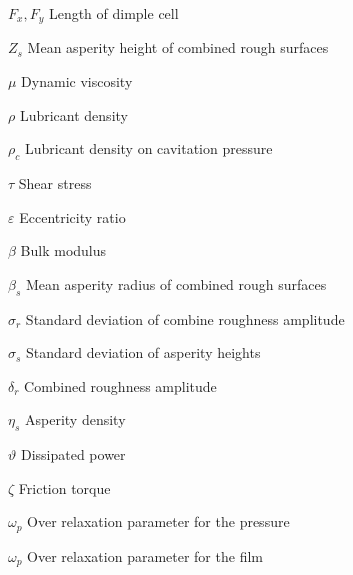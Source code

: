 \begin{simbolos}
	\item[$ F_x, F_y $] Length of dimple cell			
	\item[$ Z_s $] Mean asperity height of combined rough surfaces	
	\item[$ \mu $] Dynamic viscosity
	\item[$ \rho $] Lubricant density
	\item[$ \rho_c $] Lubricant density on cavitation pressure
	\item[$ \tau $] Shear stress
	\item[$ \varepsilon $] Eccentricity ratio
	\item[$ \beta $] Bulk modulus
	\item[$ \beta_s $] Mean asperity radius of combined rough surfaces
	\item[$ \sigma_r $] Standard deviation of combine roughness amplitude 
	\item[$ \sigma_s $] Standard deviation of asperity heights 
	\item[$ \delta_r $] Combined roughness amplitude
	\item[$ \eta_s $] Asperity density
	\item[$ \vartheta $] Dissipated power
	\item[$ \zeta $] Friction torque
	\item[$ \omega_p $] Over relaxation parameter for the pressure
	\item[$ \omega_p $] Over relaxation parameter for the film 
			
\end{simbolos}



\tableofcontents*


\cleardoublepage



\textual
\setcounter{page}{4}  %



